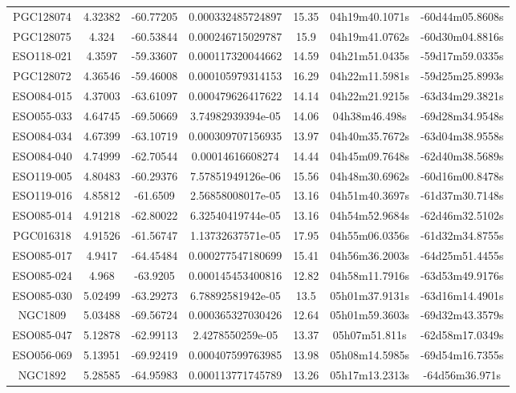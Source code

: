 \documentclass[a4paper,10pt]{article}
\begin{document}
\begin{table}
\begin{tiny}
\begin{tabular}{ccccccc}
PGC128074 & 4.32382 & -60.77205 & 0.000332485724897 & 15.35 & 04h19m40.1071s & -60d44m05.8608s \\
PGC128075 & 4.324 & -60.53844 & 0.000246715029787 & 15.9 & 04h19m41.0762s & -60d30m04.8816s \\
ESO118-021 & 4.3597 & -59.33607 & 0.000117320044662 & 14.59 & 04h21m51.0435s & -59d17m59.0335s \\
PGC128072 & 4.36546 & -59.46008 & 0.000105979314153 & 16.29 & 04h22m11.5981s & -59d25m25.8993s \\
ESO084-015 & 4.37003 & -63.61097 & 0.000479626417622 & 14.14 & 04h22m21.9215s & -63d34m29.3821s \\
ESO055-033 & 4.64745 & -69.50669 & 3.74982939394e-05 & 14.06 & 04h38m46.498s & -69d28m34.9548s \\
ESO084-034 & 4.67399 & -63.10719 & 0.000309707156935 & 13.97 & 04h40m35.7672s & -63d04m38.9558s \\
ESO084-040 & 4.74999 & -62.70544 & 0.00014616608274 & 14.44 & 04h45m09.7648s & -62d40m38.5689s \\
ESO119-005 & 4.80483 & -60.29376 & 7.57851949126e-06 & 15.56 & 04h48m30.6962s & -60d16m00.8478s \\
ESO119-016 & 4.85812 & -61.6509 & 2.56858008017e-05 & 13.16 & 04h51m40.3697s & -61d37m30.7148s \\
ESO085-014 & 4.91218 & -62.80022 & 6.32540419744e-05 & 13.16 & 04h54m52.9684s & -62d46m32.5102s \\
PGC016318 & 4.91526 & -61.56747 & 1.13732637571e-05 & 17.95 & 04h55m06.0356s & -61d32m34.8755s \\
ESO085-017 & 4.9417 & -64.45484 & 0.000277547180699 & 15.41 & 04h56m36.2003s & -64d25m51.4455s \\
ESO085-024 & 4.968 & -63.9205 & 0.000145453400816 & 12.82 & 04h58m11.7916s & -63d53m49.9176s \\
ESO085-030 & 5.02499 & -63.29273 & 6.78892581942e-05 & 13.5 & 05h01m37.9131s & -63d16m14.4901s \\
NGC1809 & 5.03488 & -69.56724 & 0.000365327030426 & 12.64 & 05h01m59.3603s & -69d32m43.3579s \\
ESO085-047 & 5.12878 & -62.99113 & 2.4278550259e-05 & 13.37 & 05h07m51.811s & -62d58m17.0349s \\
ESO056-069 & 5.13951 & -69.92419 & 0.000407599763985 & 13.98 & 05h08m14.5985s & -69d54m16.7355s \\
NGC1892 & 5.28585 & -64.95983 & 0.000113771745789 & 13.26 & 05h17m13.2313s & -64d56m36.971s \\

\end{tabular}
\end{tiny}
\end{table}
\end{document}
